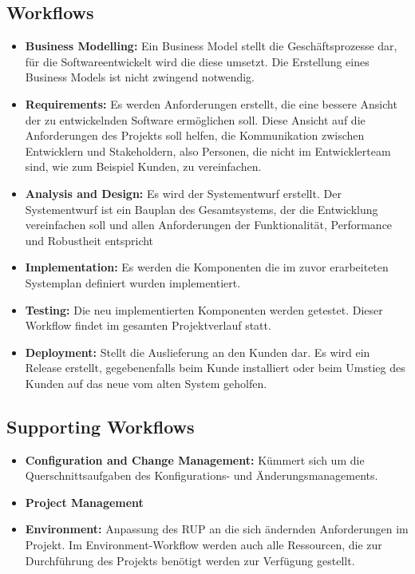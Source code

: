   \subsection{Workflows}
  \begin{itemize}
		\item \textbf{Business Modelling:} Ein Business Model stellt die Geschäftsprozesse dar, für die Softwareentwickelt wird die diese umsetzt. Die Erstellung eines Business Models ist nicht zwingend notwendig.
		\item \textbf{Requirements:} Es werden Anforderungen erstellt, die eine bessere Ansicht der zu entwickelnden Software ermöglichen soll. Diese Ansicht auf die Anforderungen des Projekts soll helfen, die Kommunikation zwischen Entwicklern und Stakeholdern, also Personen, die nicht im Entwicklerteam sind, wie zum Beispiel Kunden, zu vereinfachen.
		\item \textbf{Analysis and Design:} Es wird der Systementwurf erstellt. Der Systementwurf ist ein Bauplan des Gesamtsystems, der die Entwicklung vereinfachen soll und allen Anforderungen der Funktionalität, Performance und Robustheit entspricht
		\item \textbf{Implementation:} Es werden die Komponenten die im zuvor erarbeiteten Systemplan definiert wurden implementiert.
		\item \textbf{Testing:} Die neu implementierten Komponenten werden getestet. Dieser Workflow findet im gesamten Projektverlauf statt.
		\item \textbf{Deployment:} Stellt die Auslieferung an den Kunden dar. Es wird ein Release erstellt, gegebenenfalls beim Kunde installiert oder beim Umstieg des Kunden auf das neue vom alten System geholfen.
		\end{itemize}
		
		\subsection{Supporting Workflows}
		\begin{itemize} 
			\item \textbf{Configuration and Change Management:} Kümmert sich um die Querschnittsaufgaben des Konfigurations- und Änderungsmanagements.
			\item \textbf{Project Management} 
			\item \textbf{Environment:} Anpassung des RUP an die sich ändernden Anforderungen im Projekt. Im Environment-Workflow werden auch alle Ressourcen, die zur Durchführung des Projekts benötigt werden zur Verfügung gestellt.
		\end{itemize}
		
